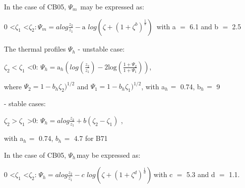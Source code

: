 In the case of CB05, $\Psi_{m\, }$ may be expressed as:

0 \textless $\zeta_{1}$ \textless $\zeta_{2}$:$_{\, }\Psi_{m} =alog\frac{z_{2} }{z_{1}
}-\mbox{a}\,\,log\left( {\zeta+\left( {1+\zeta^{b}} \right)^{\frac{1}{b}}} \right)_{\, }$ with a
$=$ 6.1 and b $=$ 2.5

The thermal profiles $\Psi_{h}$
\newline
- unstable case:

$\zeta_{2 }< \zeta_{1}$ \textless 0: $\Psi_{h}
=\mbox{a}_{h} \left( {log\left( {\frac{z_{2}
}{z_{1} }} \right)-\mbox{2log}\left(
{\frac{1+\Psi_{2} }{1+\Psi_{1}
}} \right)} \right)$,

where $\Psi_{2} =1-b_{h} \zeta_{2} )^{1/2}$ and $\Psi_{1}
=1-b_{h} \zeta_{1}
)^{1/2}$, with a$_{h\, }=$ 0.74, b$_{h\, }=$ 9

- stable cases:

$\zeta_{2 }> \zeta_{1}$ \textgreater 0: $\Psi_{h}
=alog\frac{z_{2} }{z_{1} }+b(\zeta_{2} -\zeta_{1} )$ ,

with a$_{h\, }=$ 0.74, $b_{h\, }= $ 4.7 for B71

In the case of CB05, $\Psi_{h\, }$may be expressed as:

0 \textless $\zeta_{1}$ \textless $\zeta_{2}$:$_{\, \, }\Psi_{h} =alog\frac{z_{2} }{z_{1}
}-c\,\,log\left( {\zeta+\left( {1+\zeta^{d}} \right)^{\frac{1}{d}}} \right)_{\, }$with c
$=$ 5.3 and d $=$ 1.1.

